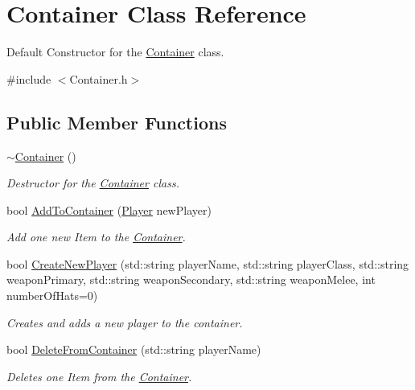 \hypertarget{class_container}{}\section{Container Class Reference}
\label{class_container}


Default Constructor for the \hyperlink{class_container}{Container} class.  




{\ttfamily \#include $<$Container.\+h$>$}

\subsection*{Public Member Functions}
\begin{DoxyCompactItemize}
\item 
\hyperlink{class_container_ae9f5d07bfc3defda274aa06091c19f56}{$\sim$\+Container} ()
\begin{DoxyCompactList}\small\item\em Destructor for the \hyperlink{class_container}{Container} class. \end{DoxyCompactList}\item 
bool \hyperlink{class_container_adcb2699db821af086db2fbce6a9470e1}{Add\+To\+Container} (\hyperlink{class_player}{Player} new\+Player)
\begin{DoxyCompactList}\small\item\em Add one new Item to the \hyperlink{class_container}{Container}. \end{DoxyCompactList}\item 
bool \hyperlink{class_container_a7a2634d599cbf831aba29062fdbbd1a2}{Create\+New\+Player} (std\+::string player\+Name, std\+::string player\+Class, std\+::string weapon\+Primary, std\+::string weapon\+Secondary, std\+::string weapon\+Melee, int number\+Of\+Hats=0)
\begin{DoxyCompactList}\small\item\em Creates and adds a new player to the container. \end{DoxyCompactList}\item 
bool \hyperlink{class_container_a80c04381837dce92a2b7e466ebd087e8}{Delete\+From\+Container} (std\+::string player\+Name)
\begin{DoxyCompactList}\small\item\em Deletes one Item from the \hyperlink{class_container}{Container}. \end{DoxyCompactList}\item 

\end{DoxyCompactItemize}
